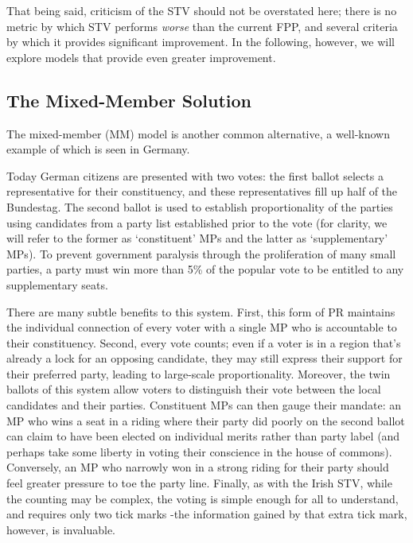 \documentclass[DIV=calc, paper=a4, fontsize=11pt, twocolumn]{scrartcl}	 %
\begin{document}
That being said, criticism of the STV should not be overstated here; there is no metric by which STV performs \emph{worse} than the current FPP, and several criteria by which it provides significant improvement. 
In the following, however, we will explore models that provide even greater improvement.


\subsection{The Mixed-Member Solution}
\label{sec:german_model}

The mixed-member (MM) model is another common alternative, a well-known example of which is seen in Germany.

Today German citizens are presented with two votes: the first ballot selects a representative for their constituency, and these representatives fill up half of the Bundestag. 
The second ballot is used to establish proportionality of the parties using candidates from a party list established prior to the vote
(for clarity, we will refer to the former as `constituent' MPs  and the latter as `supplementary' MPs).
To prevent government paralysis through the proliferation of many small parties, a party must win more than 5\% of the popular vote to be entitled to any supplementary seats.

There are many subtle benefits to this system. 
First, this form of PR maintains the individual connection of every voter with a single MP who is accountable to their constituency.
Second, every vote counts; even if a voter is in a region that's already a lock for an opposing candidate, they may still express their support for their preferred party, leading to large-scale proportionality.
Moreover, the twin ballots of this system allow voters to distinguish their vote between the local candidates and their parties.  Constituent MPs can then gauge their mandate: an MP who wins a seat in a riding where their party did poorly on the second ballot can claim to have been elected on individual merits rather than party label (and perhaps take some liberty in voting their conscience in the house of commons). Conversely, an MP who narrowly won in a strong riding for their party should feel greater pressure to toe the party line.
Finally, as with the Irish STV, while the counting may be complex, the voting is simple enough for all to understand, and requires only two tick marks \--the information gained by that extra tick mark, however, is invaluable.
\end{document}
